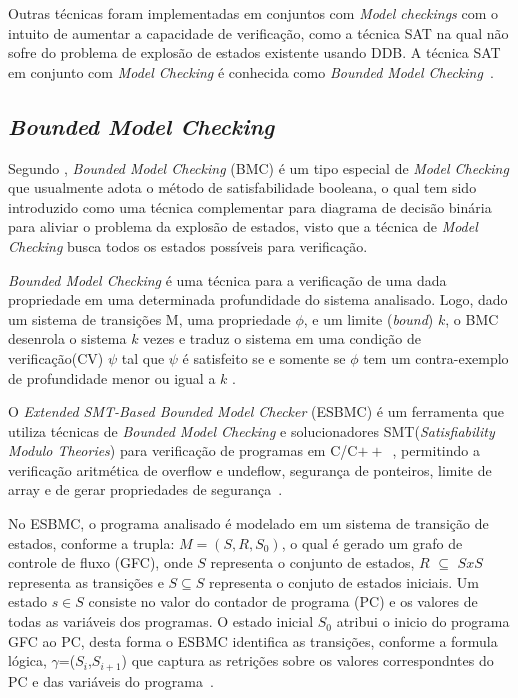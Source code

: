 \par
Outras técnicas foram implementadas em conjuntos com \textit{Model checkings} com o intuito de aumentar a capacidade de verificação, como a técnica SAT na qual não sofre do problema de explosão de estados existente usando DDB. A técnica SAT em conjunto com \textit{Model Checking} é conhecida como \textit{Bounded Model Checking}~\cite{biere2003bounded}.

\subsection{\label{cap:bounded}\textit{Bounded Model Checking}}
Segundo , \textit{Bounded Model Checking} (BMC) é um tipo especial de \textit{Model Checking} que usualmente adota o método de satisfabilidade booleana, o qual tem sido introduzido como uma técnica complementar para diagrama de decisão binária para aliviar o problema da explosão de estados, visto que a técnica de \textit{Model Checking} busca todos os estados possíveis para verificação.

\par
\textit{Bounded Model Checking} é uma técnica para a verificação de uma dada propriedade em uma determinada profundidade do sistema analisado. Logo, dado um sistema de transições M, uma propriedade $\phi$, e um limite (\textit{bound}) $k$, o BMC desenrola o sistema $k$ vezes e traduz o sistema em uma condição de verificação(CV) $\psi$ tal que $\psi$ é satisfeito se e somente se $\phi$ tem um contra-exemplo de profundidade menor ou igual a $k$ \cite{rocha2015verificaccao}.

\par
O \textit{Extended SMT-Based Bounded Model Checker} (ESBMC) é um ferramenta que utiliza técnicas de \textit{Bounded Model Checking} e solucionadores SMT(\textit{Satisfiability Modulo Theories}) para verificação de programas em C/C$++$~\cite{rocha2015model}, permitindo a verificação aritmética de overflow e undeflow, segurança de ponteiros, limite de array e de gerar propriedades de segurança~\cite{cordeiro2012smt,rocha2015verificaccao}. 

\par
No ESBMC, o programa analisado é modelado em um sistema de transição de estados, conforme a trupla: $M=(S,R,S_{0})$, o qual é gerado um grafo de controle de fluxo (GFC), onde $S$ representa o conjunto de estados, $R$ $\subseteq$ $SxS$ representa as transições e $S \subseteq S$ representa o conjuto de estados iniciais. Um estado $s \in S$ consiste no valor do contador de programa (PC) e os valores de todas as variáveis dos programas. O estado inicial $S_{0}$ atribui o inicio do programa GFC ao PC, desta forma o ESBMC identifica as transições, conforme a formula lógica, $\gamma$=($S_{i}$,$S_{i+1}$) que captura as retrições sobre os valores correspondntes do PC e das variáveis do programa~\cite{cordeiro2012smt}.

